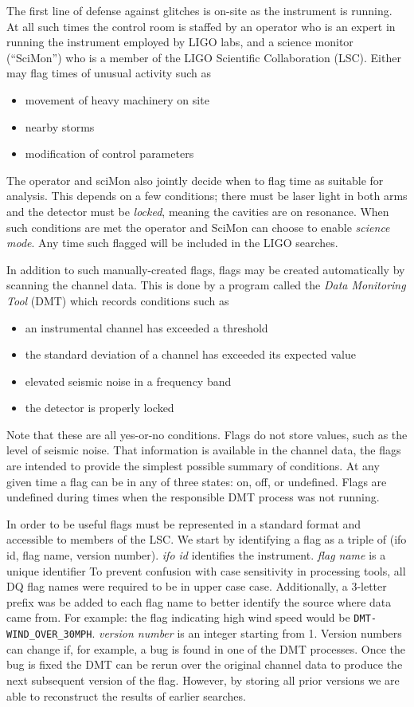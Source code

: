 The first line of defense against glitches is on-site as the
instrument is running.  At all such times the control room is staffed
by an operator who is an expert in running the instrument employed by
LIGO labs, and a science monitor (``SciMon'') who is a member of the
LIGO Scientific Collaboration (LSC).  Either may flag times of unusual
activity such as
\begin{itemize}
\item movement of heavy machinery on site
\item nearby storms
\item modification of control parameters
\end{itemize}
%
The operator and sciMon also jointly decide when to flag time as
suitable for analysis.  This depends on a few conditions; there must
be laser light in both arms and the detector must be \emph{locked},
meaning the cavities are on resonance.  When such conditions are met
the operator and SciMon can choose to enable \emph{science mode}.  Any
time such flagged will be included in the LIGO searches.

In addition to such manually-created flags, flags may be created
automatically by scanning the channel data.  This is done by a program
called the \emph{Data Monitoring Tool} (DMT) which records conditions
such as
%
\begin{itemize}
\item an instrumental channel has exceeded a threshold
\item the standard deviation of a channel has exceeded its expected
value
\item elevated seismic noise in a frequency band
\item the detector is properly locked
\end{itemize}
%
Note that these are all yes-or-no conditions.  Flags do not store
values, such as the level of seismic noise.  That information is
available in the channel data, the flags are intended to provide the
simplest possible summary of conditions.  At any given time a flag can
be in any of three states: on, off, or undefined.  Flags are undefined
during times when the responsible DMT process was not running.

In order to be useful flags must be represented in a standard format
and accessible to members of the LSC.  We start by identifying a flag
as a triple of (ifo id, flag name, version number). \emph{ifo id}
identifies the instrument.  \emph{flag name} is a unique identifier To
prevent confusion with case sensitivity in processing tools, all DQ
flag names were required to be in upper case case. Additionally, a
3-letter prefix was be added to each flag name to better identify the
source where data came from. For example: the flag indicating high
wind speed would be \texttt{DMT-WIND\_OVER\_30MPH}.  \emph{version
number} is an integer starting from 1.  Version numbers can change if,
for example, a bug is found in one of the DMT processes.  Once the bug
is fixed the DMT can be rerun over the original channel data to
produce the next subsequent version of the flag.  However, by storing
all prior versions we are able to reconstruct the results of earlier
searches. 

